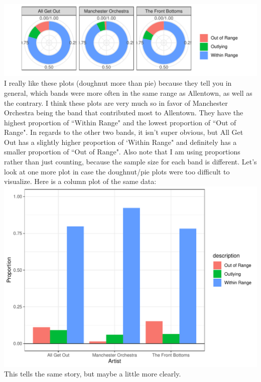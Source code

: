 \documentclass{article}\usepackage[]{graphicx}\usepackage[]{xcolor}
\makeatletter
\def\maxwidth{ %
  \ifdim\Gin@nat@width>\linewidth
    \linewidth
  \else
    \Gin@nat@width
  \fi
}
\newenvironment{knitrout}{}{} %
\makeatother
\begin{document}
\begin{multicols}{2}
\begin{knitrout}
\includegraphics[width=\maxwidth]{figure/unnamed-chunk-2-2} 
\end{knitrout}
I really like these plots (doughnut more than pie) because they tell you in general, which bands were more often in the same range as Allentown, as well as the contrary. I think these plots are very much so in favor of Manchester Orchestra being the band that contributed most to Allentown. They have the highest proportion of ``Within Range" and the lowest proportion of ``Out of Range". In regards to the other two bands, it isn't super obvious, but All Get Out has a slightly higher proportion of `Within Range" and definitely has a smaller proportion of ``Out of Range". Also note that I am using proportions rather than just counting, because the sample size for each band is different. Let's look at one more plot in case the doughnut/pie plots were too difficult to visualize. Here is a column plot of the same data:
\begin{knitrout}\scriptsize
{}\color{fgcolor}
\includegraphics[width=\maxwidth]{figure/unnamed-chunk-3-1} 
\end{knitrout}
This tells the same story, but maybe a little more clearly.

\end{multicols}
\end{document}
